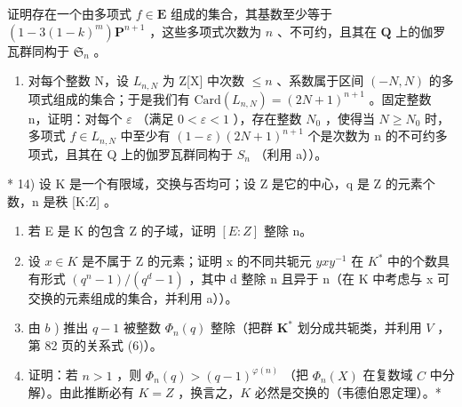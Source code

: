 证明存在一个由多项式 \(f \in \mathbf{E}\) 组成的集合，其基数至少等于 \((1 - 3(1 - k)^m) \mathbf{P}^{n+1}\) ，这些多项式次数为 \(n\) 、不可约，且其在 \(\mathbf{Q}\) 上的伽罗瓦群同构于 \(\mathfrak{S}_n\) 。

\begin{enumerate}
\def\labelenumi{\alph{enumi})}
\setcounter{enumi}{1}
\tightlist
\item
  对每个整数 N，设 \(L_{n,N}\) 为 Z{[}X{]} 中次数 \(\leqslant n\) 、系数属于区间 \((-N, N)\) 的多项式组成的集合；于是我们有 \(\text{Card}(L_{n,N}) = (2N + 1)^{n+1}\) 。固定整数 n，证明：对每个 \(\varepsilon\) （满足 \(0 < \varepsilon < 1\) ），存在整数 \(N_0\) ，使得当 \(N \geqslant N_0\) 时，多项式 \(f \in L_{n,N}\) 中至少有 \((1 - \varepsilon)(2N + 1)^{n+1}\) 个是次数为 n 的不可约多项式，且其在 Q 上的伽罗瓦群同构于 \(S_n\) （利用 a））。
\end{enumerate}

* 14) 设 K 是一个有限域，交换与否均可；设 Z 是它的中心，q 是 Z 的元素个数，n 是秩 {[}K:Z{]} 。

\begin{enumerate}
\def\labelenumi{\alph{enumi})}
\item
  若 E 是 K 的包含 Z 的子域，证明 \([E:Z]\) 整除 n。
\item
  设 \(x \in K\) 是不属于 Z 的元素；证明 x 的不同共轭元 \(yxy^{-1}\) 在 \(K^{*}\) 中的个数具有形式 \((q^{n}-1)/(q^{d}-1)\) ，其中 d 整除 n 且异于 n（在 K 中考虑与 x 可交换的元素组成的集合，并利用 a））。
\item
  由 \(b\) ) 推出 \(q - 1\) 被整数 \(\Phi_n(q)\) 整除（把群 \(\mathbf{K}^*\) 划分成共轭类，并利用 \(V\) ，第 82 页的关系式 (6)）。
\item
  证明：若 \(n > 1\) ，则 \(\Phi_n(q) > (q - 1)^{\varphi(n)}\) （把 \(\Phi_n(X)\) 在复数域 \(C\) 中分解）。由此推断必有 \(K = Z\) ，换言之，\(K\) 必然是交换的（韦德伯恩定理）。*
\end{enumerate}

